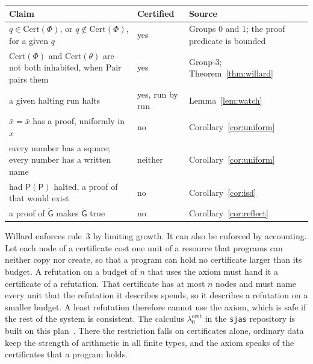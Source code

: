 \documentclass[11pt]{article}
\newcommand{\G}{\ddot{\mathsf{G}}}          %
\newcommand{\Prog}[1]{\mathsf{#1}}
\newcommand{\Pair}{\mathrm{Pair}}
\theoremstyle{plain}
\theoremstyle{definition}
\begin{document}
\begin{center}\footnotesize
\begin{tabular}{@{}>{\raggedright\arraybackslash}p{6.9cm}>{\raggedright\arraybackslash}p{2.5cm}>{\raggedright\arraybackslash}p{3.8cm}@{}}
\toprule
Claim & Certified & Source \\
\midrule
$q \in \mathrm{Cert}(\Phi)$, or $q \notin \mathrm{Cert}(\Phi)$, for a given
$q$ & yes & Groups 0 and 1; the proof predicate is bounded \\
$\mathrm{Cert}(\Phi)$ and $\mathrm{Cert}(\theta)$ are not both inhabited,
when $\Pair$ pairs them & yes & Group-3; Theorem~\ref{thm:willard} \\
a given halting run halts & yes, run by run & Lemma~\ref{lem:watch} \\
$\bar x = \bar x$ has a proof, uniformly in $x$ & no &
Corollary~\ref{cor:uniform} \\
every number has a square; every number has a written name & neither &
Corollary~\ref{cor:uniform} \\
had $\Prog{P}(\Prog{P})$ halted, a proof of that would exist & no &
Corollary~\ref{cor:isd} \\
a proof of $\G$ makes $\G$ true & no & Corollary~\ref{cor:reflect} \\
\bottomrule
\end{tabular}
\end{center}

\noindent
Willard enforces rule~3 by limiting growth. It can also be enforced by
accounting. Let each node of a certificate cost one unit of a resource that
programs can neither copy nor create, so that a program can hold no
certificate larger than its budget. A refutation on a budget of $n$ that
uses the axiom must hand it a certificate of a refutation. That certificate
has at most $n$ nodes and must name every unit that the refutation it
describes spends, so it describes a refutation on a smaller budget. A least
refutation therefore cannot use the axiom, which is safe if the rest of the
system is consistent. The calculus
$\lambda^{\mathrm{cert}}_0$ in the \texttt{sjas} repository is built on this
plan~\cite{lcert}. There the restriction falls on certificates alone,
ordinary data keep the strength of arithmetic in all finite types, and the
axiom speaks of the certificates that a program holds.
\end{document}
